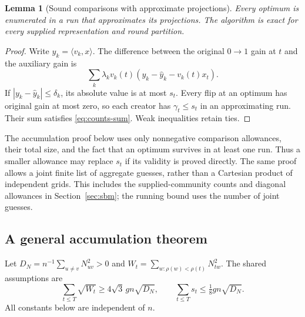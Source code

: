 \documentclass[11pt,a4paper]{article}
\newtheorem{lemma}[theorem]{Lemma}
\theoremstyle{definition}
\theoremstyle{remark}
\begin{document}
\begin{lemma}[Sound comparisons with approximate projections]\label{lem:counts-exact}
Every optimum is enumerated in a run that approximates its projections.
The algorithm is exact for every supplied representation and round partition.
\end{lemma}
\begin{proof}
Write $y_k=\langle v_k,x\rangle$. The difference between the original
$0\to1$ gain at $t$ and the auxiliary gain is
\[
 \sum_k\lambda_kv_k(t)(y_k-\hat y_k-v_k(t)x_t).
\]
If $|y_k-\hat y_k|\le\delta_k$, its absolute value is at most $s_t$.
Every flip at an optimum has original gain at most zero, so each creator
has $\gamma_t\le s_t$ in an approximating run. Their sum satisfies
\eqref{eq:counts-sum}. Weak inequalities retain ties.
\end{proof}

The accumulation proof below uses only nonnegative comparison allowances,
their total size, and the fact that an optimum survives in at least one
run. Thus a smaller allowance may replace $s_t$ if its validity is proved
directly. The same proof allows a joint finite list of aggregate guesses,
rather than a Cartesian product of independent grids. This includes the
supplied-community counts and diagonal allowances in
Section~\ref{sec:sbm}; the running bound uses the number of joint guesses.

\subsection{A general accumulation theorem}

Let $D_N=n^{-1}\sum_{u\ne v}N_{uv}^2>0$ and
$W_t=\sum_{w:\rho(w)<\rho(t)}N_{tw}^2$. The shared assumptions are
\begin{equation}
 \sum_{t\le T}\sqrt{W_t}\ge4\sqrt3\,g n\sqrt{D_N},\qquad
 \sum_{t\le T}s_t\le\tfrac18g n\sqrt{D_N}.       \label{eq:profile-slack}
\end{equation}
All constants below are independent of $n$.
\end{document}
